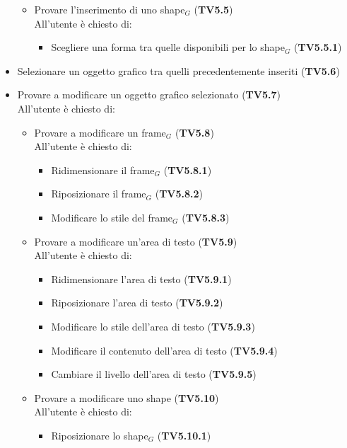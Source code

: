 \begin{itemize}
\begin{itemize}
\begin{itemize}
        \end{itemize}
        \item Provare l'inserimento di uno shape$_G$  (\textbf{TV5.5})\\
        All'utente è chiesto di:		
        \begin{itemize}
        	\item Scegliere una forma tra quelle disponibili per lo shape$_G$ (\textbf{TV5.5.1})
        \end{itemize}
	\end{itemize}
	\item Selezionare un oggetto grafico tra quelli precedentemente inseriti (\textbf{TV5.6})
	\item Provare a modificare un oggetto grafico selezionato (\textbf{TV5.7})\\
	All'utente è chiesto di:
    \begin{itemize}
		\item Provare a modificare un frame$_G$ (\textbf{TV5.8})\\
			All'utente è chiesto di:
			\begin{itemize}
				\item Ridimensionare il frame$_G$ (\textbf{TV5.8.1})
				\item Riposizionare il frame$_G$ (\textbf{TV5.8.2})
				\item Modificare lo stile del frame$_G$  (\textbf{TV5.8.3})
		    \end{itemize}
		 \item Provare a modificare un'area di testo (\textbf{TV5.9})\\
		 	All'utente è chiesto di:
		 	\begin{itemize}
		 		\item Ridimensionare l'area di testo (\textbf{TV5.9.1})
		 		\item Riposizionare l'area di testo (\textbf{TV5.9.2})
		 		\item Modificare lo stile dell'area di testo (\textbf{TV5.9.3})
		 		\item Modificare il contenuto dell'area di testo (\textbf{TV5.9.4})
		 		\item Cambiare il livello dell'area di testo (\textbf{TV5.9.5})
		 	\end{itemize}
		 \item Provare a modificare uno shape (\textbf{TV5.10})\\
		 All'utente è chiesto di:
		 \begin{itemize}
		 	\item Riposizionare lo shape$_G$ (\textbf{TV5.10.1})

\end{itemize}
\end{itemize}
\end{itemize}
